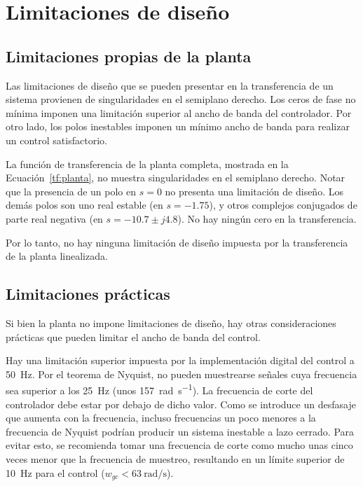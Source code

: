 \section{Limitaciones de diseño}


\subsection{Limitaciones propias de la planta}

Las limitaciones de diseño que se pueden presentar en la transferencia de un sistema provienen de singularidades en el semiplano derecho. Los ceros de fase no mínima imponen una limitación superior al ancho de banda del controlador. Por otro lado, los polos inestables imponen un mínimo ancho de banda para realizar un control satisfactorio.

La función de transferencia de la planta completa, mostrada en la Ecuación~\eqref{tf:planta}, no muestra singularidades en el semiplano derecho. Notar que la presencia de un polo en $s = 0$ no presenta una limitación de diseño. Los demás polos son uno real estable (en $s = -1.75$), y otros complejos conjugados de parte real negativa (en $s = -10.7 \pm j4.8$). No hay ningún cero en la transferencia.

Por lo tanto, no hay ninguna limitación de diseño impuesta por la transferencia de la planta linealizada.

\subsection{Limitaciones prácticas}

Si bien la planta no impone limitaciones de diseño, hay otras consideraciones prácticas que pueden limitar el ancho de banda del control.

Hay una limitación superior impuesta por la implementación digital del control a \qty{50}{\Hz}. Por el teorema de Nyquist, no pueden muestrearse señales cuya frecuencia sea superior a los \qty{25}{\Hz} (unos \qty{157}{\radian\per\s}). La frecuencia de corte del controlador debe estar por debajo de dicho valor. Como se introduce un desfasaje que aumenta con la frecuencia, incluso frecuencias un poco menores a la frecuencia de Nyquist podrían producir un sistema inestable a lazo cerrado. Para evitar esto, se recomienda tomar una frecuencia de corte como mucho unas cinco veces menor que la frecuencia de muestreo, resultando en un límite superior de \qty{10}{\Hz} para el control ($w_{gc} < \qty{63}{\radian\per\s}$).

